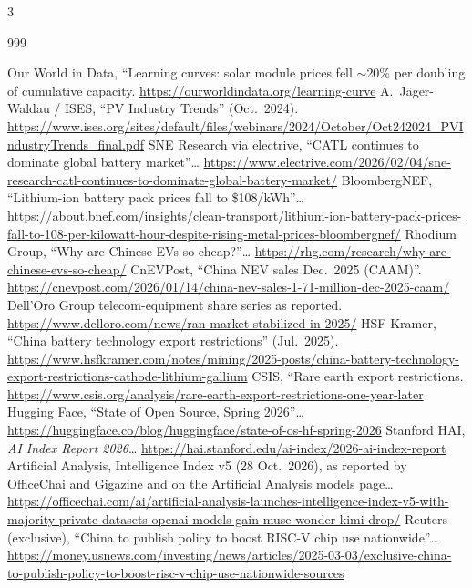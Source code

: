 \begin{multicols}{3}
\begin{thebibliography}{999}
\setlength{\itemsep}{0pt}
\raggedright
{} Our World in Data, ``Learning curves: solar module prices fell $\sim$20\% per doubling of cumulative capacity. \url{https://ourworldindata.org/learning-curve}
 A.~J\"ager-Waldau / ISES, ``PV Industry Trends'' (Oct.\ 2024). \url{https://www.ises.org/sites/default/files/webinars/2024/October/Oct242024_PVIndustryTrends_final.pdf}
 SNE Research via electrive, ``CATL continues to dominate global battery market''… \url{https://www.electrive.com/2026/02/04/sne-research-catl-continues-to-dominate-global-battery-market/}
 BloombergNEF, ``Lithium-ion battery pack prices fall to \$108/kWh''… \url{https://about.bnef.com/insights/clean-transport/lithium-ion-battery-pack-prices-fall-to-108-per-kilowatt-hour-despite-rising-metal-prices-bloombergnef/}
 Rhodium Group, ``Why are Chinese EVs so cheap?''… \url{https://rhg.com/research/why-are-chinese-evs-so-cheap/}
 CnEVPost, ``China NEV sales Dec.\ 2025 (CAAM)''. \url{https://cnevpost.com/2026/01/14/china-nev-sales-1-71-million-dec-2025-caam/}
 Dell'Oro Group telecom-equipment share series as reported. \url{https://www.delloro.com/news/ran-market-stabilized-in-2025/}
 HSF Kramer, ``China battery technology export restrictions'' (Jul.\ 2025). \url{https://www.hsfkramer.com/notes/mining/2025-posts/china-battery-technology-export-restrictions-cathode-lithium-gallium}
 CSIS, ``Rare earth export restrictions. \url{https://www.csis.org/analysis/rare-earth-export-restrictions-one-year-later}
 Hugging Face, ``State of Open Source, Spring 2026''… \url{https://huggingface.co/blog/huggingface/state-of-os-hf-spring-2026}
 Stanford HAI, \emph{AI Index Report 2026}… \url{https://hai.stanford.edu/ai-index/2026-ai-index-report}
 Artificial Analysis, Intelligence Index v5 (28 Oct.\ 2026), as reported by OfficeChai and Gigazine and on the Artificial Analysis models page… \url{https://officechai.com/ai/artificial-analysis-launches-intelligence-index-v5-with-majority-private-datasets-openai-models-gain-muse-wonder-kimi-drop/}
 Reuters (exclusive), ``China to publish policy to boost RISC-V chip use nationwide''… \url{https://money.usnews.com/investing/news/articles/2025-03-03/exclusive-china-to-publish-policy-to-boost-risc-v-chip-use-nationwide-sources}

\end{thebibliography}
\end{multicols}
